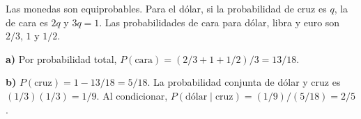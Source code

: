 Las monedas son equiprobables. Para el dólar, si la probabilidad
de cruz es $q$, la de cara es $2q$ y $3q=1$. Las probabilidades
de cara para dólar, libra y euro son $2/3$, $1$ y $1/2$.

\textbf{a)} Por probabilidad total,
$P(\text{cara})=(2/3+1+1/2)/3=\boxed{13/18}$.

\textbf{b)} $P(\text{cruz})=1-13/18=5/18$. La probabilidad
conjunta de dólar y cruz es $(1/3)(1/3)=1/9$. Al condicionar,
$P(\text{dólar}\mid\text{cruz})=(1/9)/(5/18)=\boxed{2/5}$.
